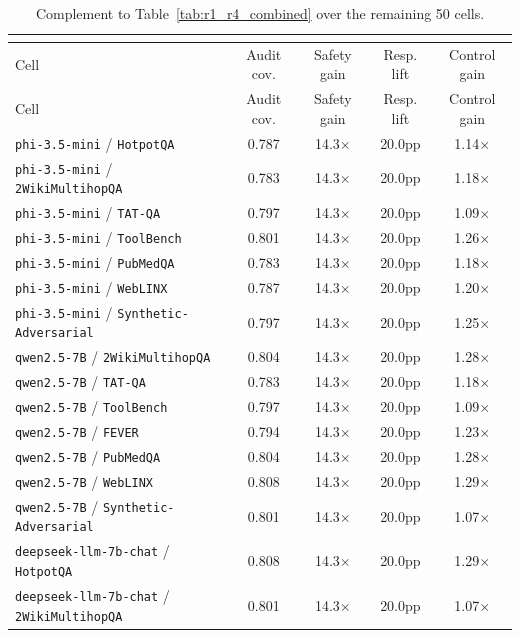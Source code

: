 \begin{longtable}{lcccc}
\caption{\small Complement to Table~\ref{tab:r1_r4_combined} over the remaining 50 cells.}\\
\label{tab:appendix_remaining_50_r1r4}\\
\toprule
Cell & Audit cov. & Safety gain & Resp. lift & Control gain \\
\midrule
\endfirsthead
\toprule
Cell & Audit cov. & Safety gain & Resp. lift & Control gain \\
\midrule
\endhead
\texttt{phi-3.5-mini} / \texttt{HotpotQA} & 0.787 & 14.3$\times$ & 20.0pp & 1.14$\times$ \\
\texttt{phi-3.5-mini} / \texttt{2WikiMultihopQA} & 0.783 & 14.3$\times$ & 20.0pp & 1.18$\times$ \\
\texttt{phi-3.5-mini} / \texttt{TAT-QA} & 0.797 & 14.3$\times$ & 20.0pp & 1.09$\times$ \\
\texttt{phi-3.5-mini} / \texttt{ToolBench} & 0.801 & 14.3$\times$ & 20.0pp & 1.26$\times$ \\
\texttt{phi-3.5-mini} / \texttt{PubMedQA} & 0.783 & 14.3$\times$ & 20.0pp & 1.18$\times$ \\
\texttt{phi-3.5-mini} / \texttt{WebLINX} & 0.787 & 14.3$\times$ & 20.0pp & 1.20$\times$ \\
\texttt{phi-3.5-mini} / \texttt{Synthetic-Adversarial} & 0.797 & 14.3$\times$ & 20.0pp & 1.25$\times$ \\
\texttt{qwen2.5-7B} / \texttt{2WikiMultihopQA} & 0.804 & 14.3$\times$ & 20.0pp & 1.28$\times$ \\
\texttt{qwen2.5-7B} / \texttt{TAT-QA} & 0.783 & 14.3$\times$ & 20.0pp & 1.18$\times$ \\
\texttt{qwen2.5-7B} / \texttt{ToolBench} & 0.797 & 14.3$\times$ & 20.0pp & 1.09$\times$ \\
\texttt{qwen2.5-7B} / \texttt{FEVER} & 0.794 & 14.3$\times$ & 20.0pp & 1.23$\times$ \\
\texttt{qwen2.5-7B} / \texttt{PubMedQA} & 0.804 & 14.3$\times$ & 20.0pp & 1.28$\times$ \\
\texttt{qwen2.5-7B} / \texttt{WebLINX} & 0.808 & 14.3$\times$ & 20.0pp & 1.29$\times$ \\
\texttt{qwen2.5-7B} / \texttt{Synthetic-Adversarial} & 0.801 & 14.3$\times$ & 20.0pp & 1.07$\times$ \\
\texttt{deepseek-llm-7b-chat} / \texttt{HotpotQA} & 0.808 & 14.3$\times$ & 20.0pp & 1.29$\times$ \\
\texttt{deepseek-llm-7b-chat} / \texttt{2WikiMultihopQA} & 0.801 & 14.3$\times$ & 20.0pp & 1.07$\times$ \\

\end{longtable}
